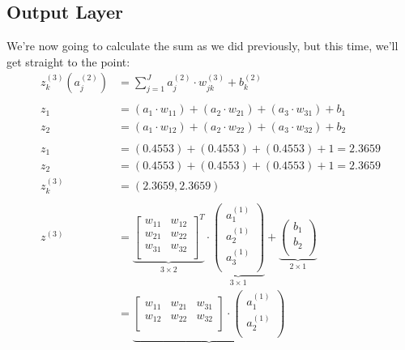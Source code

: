 \documentclass{article}
\begin{document}
\subsection{Output Layer}
We're now going to calculate the sum as we did previously, but this time, we'll get straight to the point:
\begin{align*}
    z^{(3)}_k(a^{(2)}_j) &= \sum^J_{j=1} a^{(2)}_j\cdot w^{(3)}_{jk} + b^{(2)}_k\\ \\
    z_1 &= (a_1 \cdot w_{11}) + (a_2 \cdot w_{21}) + (a_3 \cdot w_{31})+ b_1 \\     
    z_2 &= (a_1 \cdot w_{12}) + (a_2 \cdot w_{22}) + (a_3 \cdot w_{32})+ b_2 \\ \\   
    z_1 &= (0.4553) + (0.4553) + (0.4553)  + 1 = 2.3659\\ 
    z_2 &= (0.4553) + (0.4553) + (0.4553)  + 1 = 2.3659\\ 
    z^{(3)}_k &= (2.3659, 2.3659)\\ \\
    z^{(3)} &= 
    \underbrace{
    \begin{bmatrix}
        w_{11} & w_{12} \\
        w_{21} & w_{22} \\
        w_{31} & w_{32} \\
    \end{bmatrix}^T
    }_{3\times 2}
    \cdot
    \underbrace{
    \begin{pmatrix}
        a^{(1)}_1 \\
        a^{(1)}_2 \\
        a^{(1)}_3 \\
    \end{pmatrix}
    }_{3\times 1}
    +
    \underbrace{
    \begin{pmatrix}
        b_1 \\
        b_2 \\
    \end{pmatrix}
    }_{2\times 1}\\
    &=
    \underbrace{
    \begin{bmatrix}
        w_{11} & w_{21} & w_{31} \\
        w_{12} & w_{22} & w_{32} \\
    \end{bmatrix}
    \cdot
    \begin{pmatrix}
        a^{(1)}_1 \\
        a^{(1)}_2 \\

\end{pmatrix}}
\end{align*}
\end{document}
